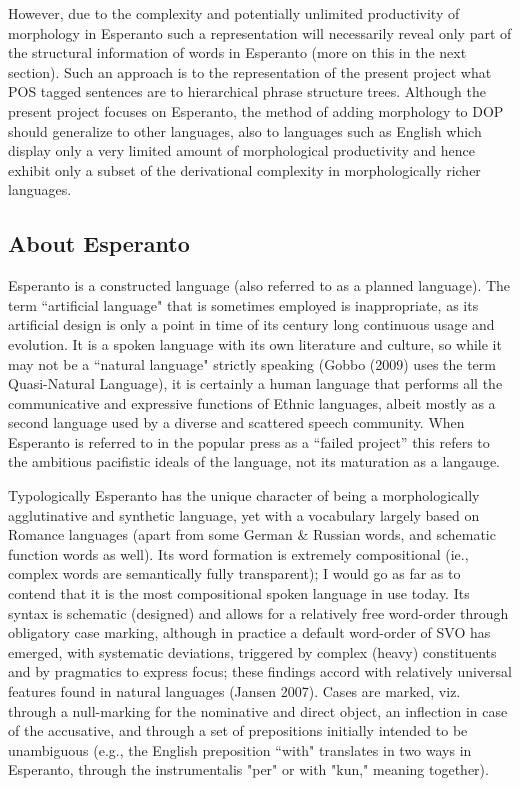 \documentclass[10pt,a4paper]{article}
\begin{document}
However, due to the complexity and potentially unlimited productivity of
morphology in Esperanto such a representation will necessarily reveal
only part of the structural information of words in Esperanto (more on this
in the next section). Such an approach is to the representation of the present
project what POS tagged sentences are to hierarchical phrase structure trees.
Although the present project focuses on Esperanto, the method of adding
morphology to DOP should generalize to other languages, also to languages
such as English which display only a very limited amount of morphological
productivity and hence exhibit only a subset of the derivational complexity in
morphologically richer languages.

\subsection{About Esperanto}

Esperanto is a constructed language (also referred to as a planned language).
The term ``artificial language" that is sometimes employed is inappropriate, as
its artificial design is only a point in time of its century long continuous
usage and evolution. It is a spoken language with its own literature and
culture, so while it may not  be a ``natural language" strictly speaking (Gobbo
(2009) uses the term Quasi-Natural Language), it is certainly a human language
that performs all the communicative and expressive functions of Ethnic
languages, albeit mostly as a second language used by a diverse and scattered
speech community. When Esperanto is referred to in the popular press as a
``failed project'' this refers to the ambitious pacifistic ideals of the
language, not its maturation as a langauge.

Typologically Esperanto has the unique character of being a morphologically
agglutinative and synthetic language, yet with a vocabulary largely based on
Romance languages (apart from some German \& Russian words, and schematic
function words as well). Its word formation is extremely compositional (ie.,
complex words are semantically fully transparent); I would go as far as to
contend that it is the most compositional spoken language in use today. Its
syntax is schematic (designed) and allows for a relatively free word-order
through obligatory case marking, although in practice a default word-order of
SVO has emerged, with systematic deviations, triggered by complex (heavy)
constituents and by pragmatics to express focus; these findings accord with
relatively universal features found in natural languages (Jansen 2007). Cases
are marked, viz. through a null-marking for the nominative and direct object,
an inflection in case of the accusative, and through a set of prepositions
initially intended to be unambiguous (e.g., the English preposition ``with"
translates in two ways in Esperanto, through the instrumentalis "per" or with
"kun," meaning together). 
\end{document}
